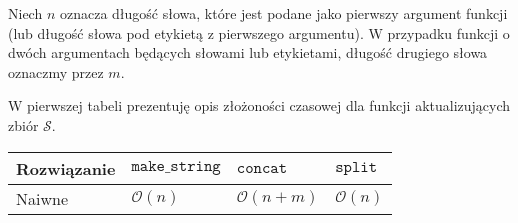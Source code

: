 \documentclass[declaration,shortabstract]{iithesis}
\theoremstyle{definition} \newtheorem{definition}{Definicja}[chapter]
\theoremstyle{remark} \newtheorem{remark}[definition]{Obserwacja}
\theoremstyle{plain} \newtheorem{theorem}[definition]{Twierdzenie}
\theoremstyle{remark} \newtheorem{example}{Przykład}[definition]
\theoremstyle{plain} \newtheorem{lemma}[definition]{Lemat}
\begin{document}





Niech $n$ oznacza długość słowa, które jest podane jako pierwszy argument funkcji (lub długość słowa pod etykietą z pierwszego argumentu). W przypadku funkcji o dwóch argumentach będących słowami lub etykietami, długość drugiego słowa oznaczmy przez $m$.

W pierwszej tabeli prezentuję opis złożoności czasowej dla funkcji aktualizujących zbiór $\mathcal{S}$.

\begin{center}
    \begin{tabular}{ | m{3cm} | >{\centering\arraybackslash}m{3cm} | >{\centering\arraybackslash}m{3cm} | >{\centering\arraybackslash}m{3cm} | }
        \hline 
        Rozwiązanie & $\texttt{make\_string}$ & $\texttt{concat}$ & $\texttt{split}$ \\
        \hline
        Naiwne & $\mathcal{O}(n)$ & $\mathcal{O}(n + m)$ & $\mathcal{O}(n)$ \\
        \hline
    \end{tabular}
\end{center}
\end{document}
